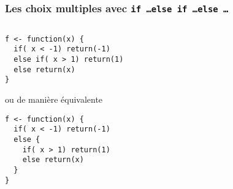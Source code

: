 \documentclass[10pt]{beamer}
\begin{document}
\begin{frame}[fragile]
  \frametitle{Les choix multiples avec \texttt{if \dots else if \dots else \dots}}

\begin{columns}[c]
\begin{column}{0.48\textwidth}
  \begin{lstlisting}[style=editor]
f <- function(x) {
  if( x < -1) return(-1)
  else if( x > 1) return(1)
  else return(x)
}
\end{lstlisting}

ou de manière équivalente
\begin{lstlisting}[style=editor]
f <- function(x) {
  if( x < -1) return(-1)
  else {
    if( x > 1) return(1)
    else return(x)
  }
}
\end{lstlisting}
\end{column}
\begin{column}{0.48\textwidth}
\end{column}
\end{columns}
\end{frame}
\end{document}
